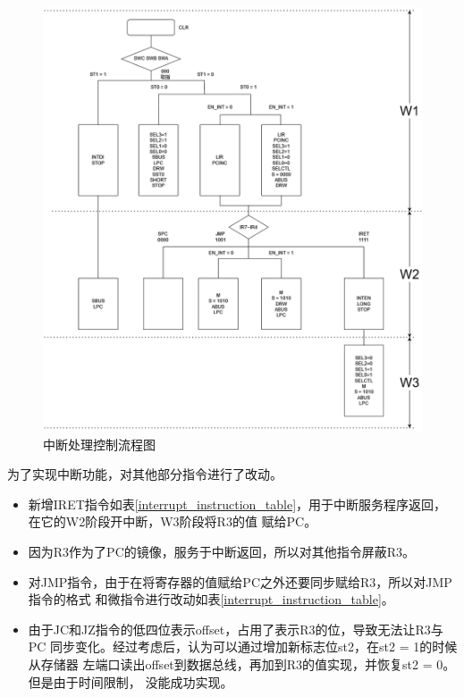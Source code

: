 \begin{figure}[htbp]
    \centering
    \label{interrupt_control_flow}
    \includegraphics[width=\textwidth]{figures/chapter3/interrupt_control_flow.drawio.png}
    \caption{中断处理控制流程图}
\end{figure}
为了实现中断功能，对其他部分指令进行了改动。
\begin{itemize}
    \item 新增IRET指令如表\ref{interrupt_instruction_table}，用于中断服务程序返回，在它的W2阶段开中断，W3阶段将R3的值
          赋给PC。
    \item 因为R3作为了PC的镜像，服务于中断返回，所以对其他指令屏蔽R3。
    \item 对JMP指令，由于在将寄存器的值赋给PC之外还要同步赋给R3，所以对JMP指令的格式
          和微指令进行改动如表\ref{interrupt_instruction_table}。
    \item 由于JC和JZ指令的低四位表示offset，占用了表示R3的位，导致无法让R3与PC
          同步变化。经过考虑后，认为可以通过增加新标志位st2，在st2 = 1的时候从存储器
          左端口读出offset到数据总线，再加到R3的值实现，并恢复st2 = 0。但是由于时间限制，
          没能成功实现。
\end{itemize}
